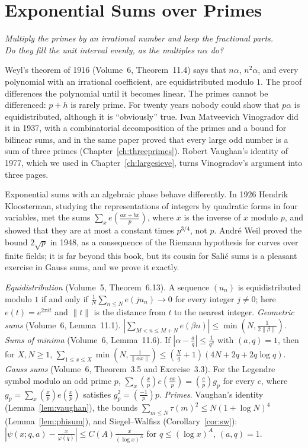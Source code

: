 \chapter{Exponential Sums over Primes}\label{ch:expsums}
\begin{center}\itshape
Multiply the primes by an irrational number and keep the fractional parts.\\
Do they fill the unit interval evenly, as the multiples $n\alpha$ do?
\end{center}

Weyl's theorem of 1916 (Volume~6, Theorem~11.4) says that $n\alpha$, $n^2\alpha$, and every polynomial with an irrational coefficient, are equidistributed modulo $1$. The proof differences the polynomial until it becomes linear. The primes cannot be differenced: $p+h$ is rarely prime. For twenty years nobody could show that $p\alpha$ is equidistributed, although it is ``obviously'' true. Ivan Matveevich Vinogradov did it in 1937, with a combinatorial decomposition of the primes and a bound for bilinear sums, and in the same paper proved that every large odd number is a sum of three primes (Chapter~\ref{ch:threeprimes}). Robert Vaughan's identity of 1977, which we used in Chapter~\ref{ch:largesieve}, turns Vinogradov's argument into three pages.

Exponential sums with an algebraic phase behave differently. In 1926 Hendrik Kloosterman, studying the representations of integers by quadratic forms in four variables, met the sums $\sum_xe(\frac{ax+b\overline x}p)$, where $\overline x$ is the inverse of $x$ modulo $p$, and showed that they are at most a constant times $p^{3/4}$, not $p$. André Weil proved the bound $2\sqrt p$ in 1948, as a consequence of the Riemann hypothesis for curves over finite fields; it is far beyond this book, but its cousin for Salié sums is a pleasant exercise in Gauss sums, and we prove it exactly.

\begin{reminder}
\emph{Equidistribution} (Volume~5, Theorem~6.13). A sequence $(u_n)$ is equidistributed modulo $1$ if and only if $\frac1N\sum_{n\le N}e(ju_n)\to0$ for every integer $j\ne0$; here $e(t)=e^{2\pi it}$ and $\|t\|$ is the distance from $t$ to the nearest integer.
\emph{Geometric sums} (Volume~6, Lemma~11.1). $|\sum_{M<n\le M+N}e(\beta n)|\le\min(N,\frac1{2\|\beta\|})$.
\emph{Sums of minima} (Volume~6, Lemma~11.6). If $|\alpha-\frac aq|\le\frac1{q^2}$ with $(a,q)=1$, then for $X,N\ge1$,
$\sum_{1\le x\le X}\min(N,\frac1{\|\alpha x\|})\le(\frac Xq+1)(4N+2q+2q\log q)$.
\emph{Gauss sums} (Volume~6, Theorem~3.5 and Exercise~3.3). For the Legendre symbol modulo an odd prime $p$, $\sum_x(\frac xp)e(\frac{cx}p)=(\frac cp)g_p$ for every $c$, where $g_p=\sum_x(\frac xp)e(\frac xp)$ satisfies $g_p^2=(\frac{-1}p)p$.
\emph{Primes}. Vaughan's identity (Lemma~\ref{lem:vaughan}), the bounds $\sum_{m\le N}\tau(m)^2\le N(1+\log N)^4$ (Lemma~\ref{lem:phisum}), and Siegel--Walfisz (Corollary~\ref{cor:sw}): $|\psi(x;q,a)-\frac x{\varphi(q)}|\le C(A)\frac x{(\log x)^A}$ for $q\le(\log x)^A$, $(a,q)=1$.
\end{reminder}

